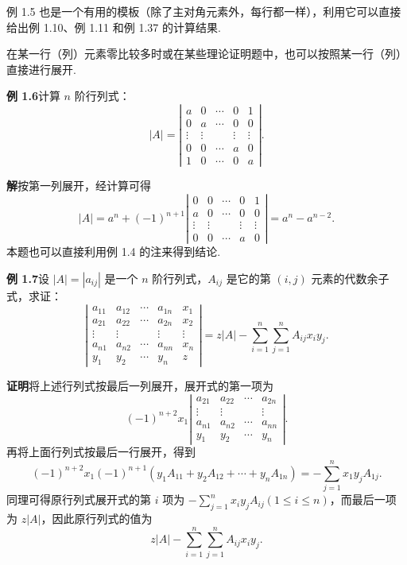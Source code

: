 \documentclass[UTF8, 12pt, fontset=fandol, oneside]{ctexart}
\begin{document}
例 1.5 也是一个有用的模板（除了主对角元素外，每行都一样），利用它可以直接给出例 1.10、例 1.11 和例 1.37 的计算结果.

在某一行（列）元素零比较多时或在某些理论证明题中，也可以按照某一行（列）直接进行展开.

\noindent\textbf{例 1.6}\quad 计算 $n$ 阶行列式：
\[
|A|=\left|\begin{array}{ccccc}
a & 0 & \cdots & 0 & 1\\
0 & a & \cdots & 0 & 0\\
\vdots & \vdots &        & \vdots & \vdots\\
0 & 0 & \cdots & a & 0\\
1 & 0 & \cdots & 0 & a
\end{array}\right|.
\]

\noindent\textbf{解}\quad 按第一列展开，经计算可得
\[
|A|=a^n+(-1)^{n+1}
\left|\begin{array}{ccccc}
0 & 0 & \cdots & 0 & 1\\
a & 0 & \cdots & 0 & 0\\
\vdots & \vdots &        & \vdots & \vdots\\
0 & 0 & \cdots & a & 0
\end{array}\right|
=a^n-a^{n-2}.
\]
本题也可以直接利用例 1.4 的注来得到结论.

\noindent\textbf{例 1.7}\quad 设 $|A|=|a_{ij}|$ 是一个 $n$ 阶行列式，$A_{ij}$ 是它的第 $(i,j)$ 元素的代数余子式，求证：
\[
\left|\begin{array}{ccccc}
a_{11} & a_{12} & \cdots & a_{1n} & x_1\\
a_{21} & a_{22} & \cdots & a_{2n} & x_2\\
\vdots & \vdots &        & \vdots & \vdots\\
a_{n1} & a_{n2} & \cdots & a_{nn} & x_n\\
y_1 & y_2 & \cdots & y_n & z
\end{array}\right|
=z|A|-\sum_{i=1}^n\sum_{j=1}^n A_{ij}x_iy_j.
\]

\noindent\textbf{证明}\quad 将上述行列式按最后一列展开，展开式的第一项为
\[
(-1)^{n+2}x_1
\left|\begin{array}{cccc}
a_{21} & a_{22} & \cdots & a_{2n}\\
\vdots & \vdots &        & \vdots\\
a_{n1} & a_{n2} & \cdots & a_{nn}\\
y_1 & y_2 & \cdots & y_n
\end{array}\right|.
\]
再将上面行列式按最后一行展开，得到
\[
(-1)^{n+2}x_1(-1)^{n+1}(y_1A_{11}+y_2A_{12}+\cdots+y_nA_{1n})
=-\sum_{j=1}^n x_1y_jA_{1j}.
\]
同理可得原行列式展开式的第 $i$ 项为 $-\sum_{j=1}^n x_iy_jA_{ij}(1\le i\le n)$，而最后一项为 $z|A|$，因此原行列式的值为
\[
z|A|-\sum_{i=1}^n\sum_{j=1}^n A_{ij}x_iy_j.
\]
\end{document}
